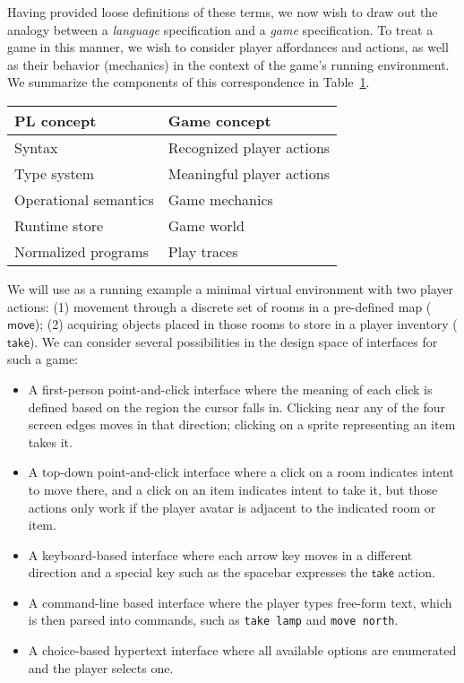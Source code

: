   Having provided loose definitions of these terms, we now wish to draw out
  the analogy between a {\em language} specification and a {\em game}
  specification. To treat a game in this manner, we wish to consider player
  affordances and actions, as well as their behavior (mechanics) in the
  context of the game's running environment. We summarize the components of
  this correspondence in Table~\ref{tab:correspondence}.

  \begin{table}
  \begin{tabular}{ll}
    PL concept & Game concept\\
    \hline
    Syntax & Recognized player actions \\
    Type system & Meaningful player actions \\
    Operational semantics & Game mechanics \\
    Runtime store & Game world \\
    Normalized programs & Play traces 
  \end{tabular}
  \label{tab:correspondence}
  \end{table}

  \newcommand{\cmove}{\mathsf{move}}
  \newcommand{\ctake}{\mathsf{take}}

  We will use as a running example a minimal virtual environment with two
  player actions: (1) movement through a discrete set of rooms in a
  pre-defined map ($\cmove$); (2) acquiring objects placed in those rooms to store in
  a player inventory ($\ctake$).  We can consider several possibilities in
  the design space of interfaces for such a game:

  \begin{itemize}
  \item A first-person point-and-click interface where the meaning of each click is
    defined based on the region the cursor falls in. Clicking near any of the
    four screen edges moves in that direction; clicking on a sprite
    representing an item takes it.
  \item A top-down point-and-click interface where a click on a room
    indicates intent to move there, and a click on an item indicates intent
    to take it, but those actions only work if the player avatar is adjacent
    to the indicated room or item.
  \item A keyboard-based interface where each arrow key moves in a
    different direction and a special key such as the spacebar expresses
    the $\ctake$ action.
  \item A command-line based interface where the player types free-form
    text, which is then parsed into commands, such as \verb|take lamp| and \verb|move north|.
  \item A choice-based hypertext interface where all available options are
    enumerated and the player selects one.
  \end{itemize}

